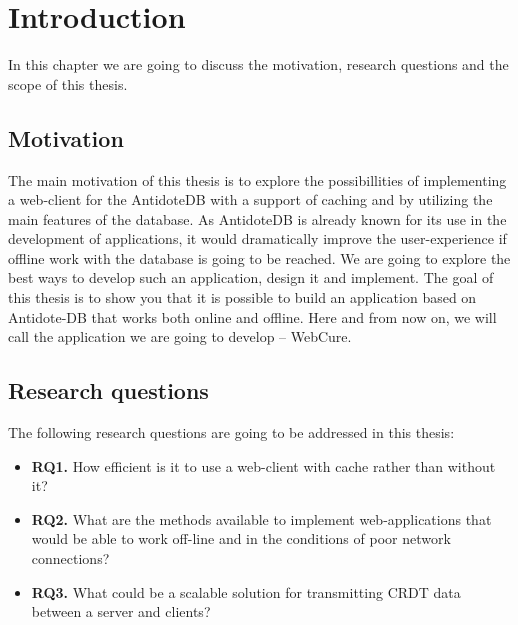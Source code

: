 \chapter{Introduction}
\label{Introduction}

In this chapter we are going to discuss the motivation, research questions and the scope of this thesis.

\section{Motivation}

The main motivation of this thesis is to explore the possibillities of implementing a web-client for the AntidoteDB with a support of caching and by utilizing the main features of the database. As AntidoteDB is already known for its use in the development of applications, it would dramatically improve the user-experience if offline work with the database is going to be reached. We are going to explore the best ways to develop such an application, design it and implement. The goal of this thesis is to show you that it is possible to build an application based on Antidote-DB that works both online and offline. Here and from now on, we will call the application we are going to develop -- WebCure.


\section{Research questions}

The following research questions are going to be addressed in this thesis:

\begin{itemize}
    \item \textbf{RQ1.} How efficient is it to use a web-client with cache rather than without it?
    \item \textbf{RQ2.} What are the methods available to implement web-applications that would be able to work off-line and
    in the conditions of poor network connections?
    \item \textbf{RQ3.} What could be a scalable solution for transmitting CRDT data between a server and clients?
  \end{itemize}





